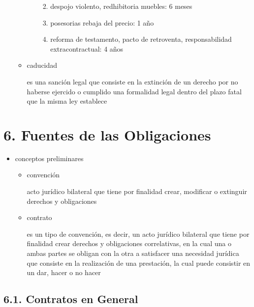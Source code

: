 \documentclass[]{article}
\providecommand{\tightlist}{%
  \setlength{\itemsep}{0pt}\setlength{\parskip}{0pt}}
\begin{document}
\begin{itemize}
\begin{itemize}
\begin{itemize}
      \begin{enumerate}
      \def\labelenumi{\arabic{enumi}.}
      \tightlist
      \item
        despojo violento, redhibitoria muebles: 6 meses
      \item
        posesorias rebaja del precio: 1 año
      \item
        reforma de testamento, pacto de retroventa, responsabilidad
        extracontractual: 4 años
      \end{enumerate}
    \end{itemize}
  \item
    caducidad

    es una sanción legal que consiste en la extinción de un derecho por
    no haberse ejercido o cumplido una formalidad legal dentro del plazo
    fatal que la misma ley establece
  \end{itemize}
\end{itemize}

\hypertarget{fuentes-de-las-obligaciones}{%
\section{6. Fuentes de las
Obligaciones}\label{fuentes-de-las-obligaciones}}

\begin{itemize}
\tightlist
\item
  conceptos preliminares

  \begin{itemize}
  \item
    convención

    acto jurídico bilateral que tiene por finalidad crear, modificar o
    extinguir derechos y obligaciones
  \item
    contrato

    es un tipo de convención, es decir, un acto jurídico bilateral que
    tiene por finalidad crear derechos y obligaciones correlativas, en
    la cual una o ambas partes se obligan con la otra a satisfacer una
    necesidad jurídica que consiste en la realización de una prestación,
    la cual puede consistir en un dar, hacer o no hacer
  \end{itemize}
\end{itemize}

\hypertarget{contratos-en-general}{%
\subsection{6.1. Contratos en General}\label{contratos-en-general}}
\end{document}
